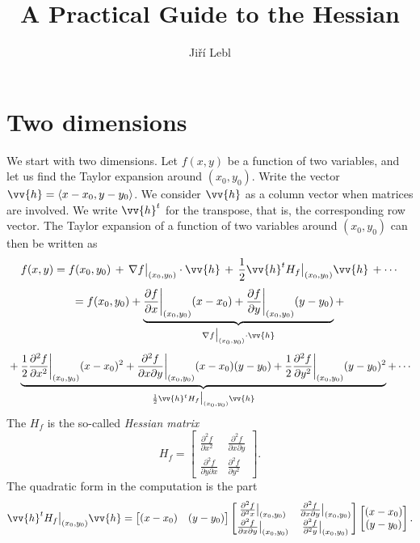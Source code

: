 \documentclass[12pt]{article}
\title{A Practical Guide to the Hessian}
\author{Ji\v{r}\'i Lebl}
\begin{document}
\maketitle

\section*{Two dimensions}

We start with two dimensions.
Let $f(x,y)$ be a function of two variables,
and let us find the
Taylor expansion around $(x_0,y_0)$.
Write the vector $\vv{h} = \langle x-x_0, y-y_0 \rangle$.  We
consider $\vv{h}$ as a column vector when matrices are involved.
We write $\vv{h}^t$ for the transpose, that is, the corresponding
row vector.  The Taylor expansion of a function of two variables around $(x_0,y_0)$ can then be written as
\[
f(x,y) = f(x_0,y_0) \, + \,
\nabla f\big|_{(x_0,y_0)} \cdot \vv{h}
\, + \,
\frac{1}{2} \vv{h}^{t} H_f\big|_{(x_0,y_0)} \vv{h} \,
+ \cdots
\]
\[
 = f(x_0,y_0) +
\underbrace{\frac{\partial f}{\partial x}\bigg|_{(x_0,y_0)} (x-x_0) +
\frac{\partial f}{\partial y}\bigg|_{(x_0,y_0)} (y-y_0)}_{\nabla
f\big|_{(x_0,y_0)} \cdot \vv{h}}
+ {}
\]
\[
{} +
\underbrace{%
\frac{1}{2} \frac{\partial^2 f}{\partial x^2}\bigg|_{(x_0,y_0)} (x-x_0)^2 +
\frac{\partial^2 f}{\partial x \partial y}\bigg|_{(x_0,y_0)} (x-x_0)(y-y_0) +
\frac{1}{2} \frac{\partial^2 f}{\partial y^2}\bigg|_{(x_0,y_0)} (y-y_0)^2}_{%
\frac{1}{2} \vv{h}^{t} H_f\big|_{(x_0,y_0)} \vv{h}}
+
\cdots
\]
The $H_f$ is the so-called \emph{Hessian matrix}
\[
H_f
=
\begin{bmatrix}
\frac{\partial^2 f}{\partial x^2} &
\frac{\partial^2 f}{\partial x \partial y} \\
\frac{\partial^2 f}{\partial y \partial x} &
\frac{\partial^2 f}{\partial y^2}
\end{bmatrix}
.
\]
The quadratic form in the computation is the part
\[
\vv{h}^{t} H_f \big|_{(x_0,y_0)} \vv{h}
=
\begin{bmatrix}
(x-x_0) & (y-y_0)
\end{bmatrix}
\begin{bmatrix}
\frac{\partial^2 f}{\partial^2 x}\big|_{(x_0,y_0)} &
\frac{\partial^2 f}{\partial x \partial y}\big|_{(x_0,y_0)} \\
\frac{\partial^2 f}{\partial x \partial y}\big|_{(x_0,y_0)} &
\frac{\partial^2 f}{\partial^2 y}\big|_{(x_0,y_0)}
\end{bmatrix}
\begin{bmatrix}
(x-x_0) \\ (y-y_0)
\end{bmatrix}
.
\]
\end{document}
